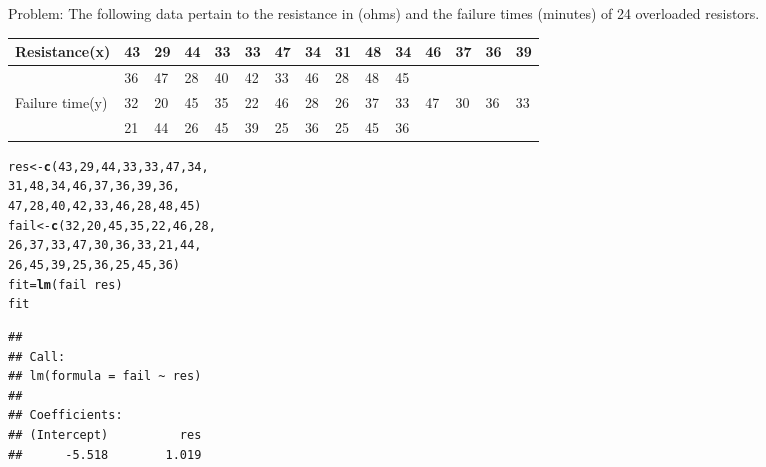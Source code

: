 \documentclass{article}\usepackage[]{graphicx}\usepackage[]{xcolor}
\makeatletter
\newcommand{\hlnum}[1]{\textcolor[rgb]{0.686,0.059,0.569}{#1}}%
\newcommand{\hlopt}[1]{\textcolor[rgb]{0,0,0}{#1}}%
\newcommand{\hldef}[1]{\textcolor[rgb]{0.345,0.345,0.345}{#1}}%
\newcommand{\hlkwb}[1]{\textcolor[rgb]{0.69,0.353,0.396}{#1}}%
\newcommand{\hlkwd}[1]{\textcolor[rgb]{0.737,0.353,0.396}{\textbf{#1}}}%
\newenvironment{kframe}{%
 \def\at@end@of@kframe{}%
 \ifinner\ifhmode%
  \def\at@end@of@kframe{\end{minipage}}%
  \begin{minipage}{\columnwidth}%
 \fi\fi%
 \def\FrameCommand##1{\hskip\@totalleftmargin \hskip-\fboxsep
 \colorbox{shadecolor}{##1}\hskip-\fboxsep
     \hskip-\linewidth \hskip-\@totalleftmargin \hskip\columnwidth}%
 \MakeFramed {\advance\hsize-\width
   \@totalleftmargin\z@ \linewidth\hsize
   \@setminipage}}%
 {\par\unskip\endMakeFramed%
 \at@end@of@kframe}
\newenvironment{knitrout}{}{} %
\makeatother
\begin{document}
Problem: \newline
The following data pertain to the resistance in (ohms) and the failure times (minutes) of 24 overloaded resistors. 
\begin{table}[h]
\begin{tabular}{|l|l|l|l|l|l|l|l|l|l|l|l|l|l|l|}
\hline
Resistance(x)   & 43 & 29 & 44 & 33 & 33 & 47 & 34 & 31 & 48 & 34 & 46 & 37 & 36 & 39 \\ \hline
                & 36 & 47 & 28 & 40 & 42 & 33 & 46 & 28 & 48 & 45 &    &    &    &    \\ \hline
Failure time(y) & 32 & 20 & 45 & 35 & 22 & 46 & 28 & 26 & 37 & 33 & 47 & 30 & 36 & 33 \\ \hline
                & 21 & 44 & 26 & 45 & 39 & 25 & 36 & 25 & 45 & 36 &    &    &    &    \\ \hline
\end{tabular}
\end{table}
\begin{knitrout}
\color{fgcolor}\begin{kframe}
\begin{alltt}
\hldef{res} \hlkwb{<-} \hlkwd{c}\hldef{(}\hlnum{43}\hldef{,}\hlnum{29}\hldef{,}\hlnum{44}\hldef{,}\hlnum{33}\hldef{,}\hlnum{33}\hldef{,}\hlnum{47}\hldef{,}\hlnum{34} \hldef{,}
         \hlnum{31}\hldef{,}\hlnum{48}\hldef{,}\hlnum{34}\hldef{,}\hlnum{46}\hldef{,}\hlnum{37}\hldef{,}\hlnum{36}\hldef{,}\hlnum{39}\hldef{,}\hlnum{36} \hldef{,}
         \hlnum{47}\hldef{,}\hlnum{28}\hldef{,}\hlnum{40}\hldef{,}\hlnum{42}\hldef{,}\hlnum{33}\hldef{,}\hlnum{46}\hldef{,}\hlnum{28}\hldef{,}\hlnum{48}\hldef{,}\hlnum{45} \hldef{)}
\hldef{fail} \hlkwb{<-} \hlkwd{c}\hldef{(}\hlnum{32}\hldef{,}\hlnum{20}\hldef{,}\hlnum{45}\hldef{,}\hlnum{35}\hldef{,}\hlnum{22}\hldef{,}\hlnum{46}\hldef{,}\hlnum{28}\hldef{,}
          \hlnum{26}\hldef{,}\hlnum{37}\hldef{,}\hlnum{33}\hldef{,}\hlnum{47}\hldef{,}\hlnum{30}\hldef{,}\hlnum{36}\hldef{,}\hlnum{33}\hldef{,}\hlnum{21}\hldef{,}\hlnum{44}\hldef{,}
          \hlnum{26}\hldef{,}\hlnum{45}\hldef{,}\hlnum{39}\hldef{,}\hlnum{25}\hldef{,}\hlnum{36}\hldef{,}\hlnum{25}\hldef{,}\hlnum{45}\hldef{,}\hlnum{36}       \hldef{)}
\hldef{fit}\hlkwb{=}\hlkwd{lm}\hldef{(fail}\hlopt{~}\hldef{res)}
\hldef{fit}
\end{alltt}
\begin{verbatim}
## 
## Call:
## lm(formula = fail ~ res)
## 
## Coefficients:
## (Intercept)          res  
##      -5.518        1.019
\end{verbatim}
\end{kframe}
\end{knitrout}
\end{document}

